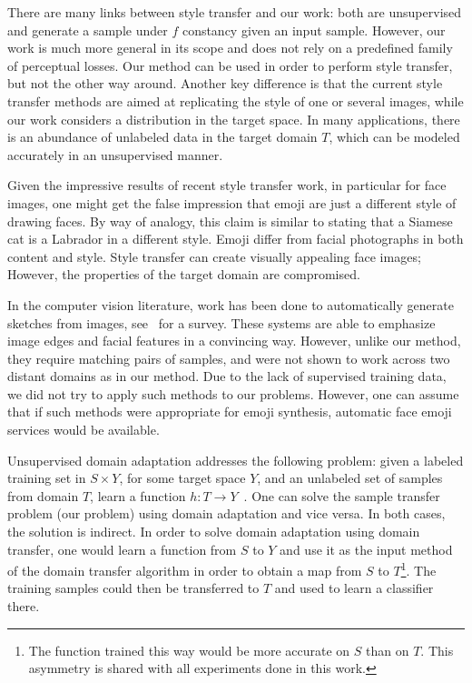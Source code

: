 \documentclass{article} \usepackage{iclr2017_conference,times}
\begin{document}
There are many links between style transfer and our work: both are unsupervised and generate a sample under $f$ constancy given an input sample. However, our work is much more general in its scope and does not rely on a predefined family of perceptual losses. Our method can be used in order to perform style transfer, but not the other way around.  Another key difference is that the current style transfer methods are aimed at replicating the style of one or several images, while our work considers a distribution in the target space. In many applications, there is an abundance of unlabeled data in the target domain $T$, which can be modeled accurately in an unsupervised manner.

Given the impressive results of recent style transfer work, in particular for face images, one might get the false impression that emoji are just a different style of drawing faces. By way of analogy, this claim is similar to stating that a Siamese cat is a Labrador in a different style. Emoji differ from facial photographs in both content and style. Style transfer can create visually appealing face images; However, the  properties of the target domain are compromised. 

In the computer vision literature, work has been done to automatically generate sketches from images, see~\citet{6243138} for a survey. These systems are able to emphasize image edges and facial features in a convincing way. However, unlike our method, they require matching pairs of samples, and were not shown to work across two distant domains as in our method. Due to the lack of supervised training data, we did not try to apply such methods to our problems. However, one can assume that if such methods were appropriate for emoji synthesis, automatic face emoji services would be available.

Unsupervised domain adaptation addresses the following problem: given a labeled training set in $S \times Y$, for some target space $Y$, and an unlabeled set of samples from domain $T$, learn a function $h:T \rightarrow Y$~\citep{ICML2012Chen_416,domaingan}. One can solve the sample transfer problem (our problem) using domain adaptation and vice versa. In both cases, the solution is indirect. In order to solve domain adaptation using domain transfer, one would learn a function from $S$ to $Y$ and use it as the input method of the domain transfer algorithm in order to obtain a map from $S$ to $T$\footnote{The function trained this way would be more accurate on $S$ than on $T$. This asymmetry is shared with all experiments done in this work.}. The training samples could then be transferred to $T$ and used to learn a classifier there. 
\end{document}
